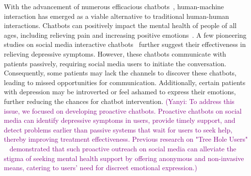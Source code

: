 With the advancement of numerous efficacious chatbots~\cite{ahmed2023chatbot}, human-machine interaction has emerged as a viable alternative to traditional human-human interactions. Chatbots can positively impact the mental health of people of all ages, including relieving pain and increasing positive emotions~\cite{chen2018social, kabacinska2021socially, miner2016conversational}. A few pioneering studies on social media interactive chatbots~\cite{kaywan2023early, chenbt5153} further suggest their effectiveness in relieving depressive symptoms.
However, these chatbots communicate with patients passively, requiring social media users to initiate the conversation. Consequently, some patients may lack the channels to discover these chatbots, leading to missed opportunities for communication. Additionally, certain patients with depression may be introverted or feel ashamed to express their emotions, further reducing the chances for chatbot intervention. \textcolor{purple}{(Yanyi: To address this issue, we focused on developing proactive chatbots. Proactive chatbots on social media can identify depressive symptoms in users, provide timely support, and detect problems earlier than passive systems that wait for users to seek help, thereby improving treatment effectiveness. Previous research on "Tree Hole Users" ~\cite{Jing2020} demonstrated that such proactive outreach on social media can alleviate the stigma of seeking mental health support by offering anonymous and non-invasive means, catering to users' need for discreet emotional expression.)}

